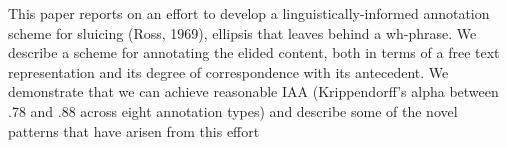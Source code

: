 This paper reports on an effort to develop a linguistically-informed annotation scheme for sluicing (Ross, 1969), ellipsis that leaves behind a wh-phrase. We describe a scheme for annotating the elided content, both in terms of a free text representation and its degree of correspondence with its antecedent. We demonstrate that we can achieve reasonable IAA (Krippendorff's alpha between .78 and .88 across eight annotation types) and describe some of the novel patterns that have arisen from this effort
